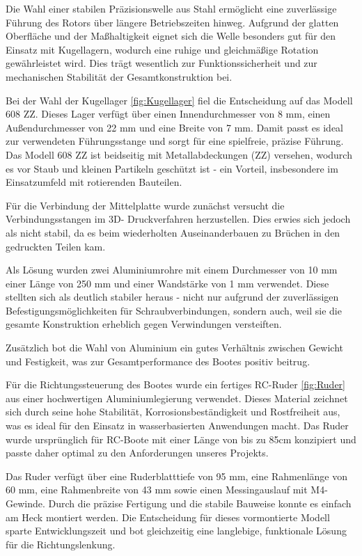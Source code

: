 \documentclass[a4paper,12pt]{article}
\begin{document}
Die Wahl einer stabilen Präzisionswelle aus Stahl ermöglicht eine zuverlässige Führung des Rotors über längere Betriebszeiten hinweg. Aufgrund der glatten Oberfläche und der Maßhaltigkeit eignet sich die Welle besonders gut für den Einsatz mit Kugellagern, wodurch eine ruhige und gleichmäßige Rotation gewährleistet wird. Dies trägt wesentlich zur Funktionssicherheit und zur mechanischen Stabilität der Gesamtkonstruktion bei.\newline


Bei der Wahl der Kugellager \ref{fig:Kugellager} fiel die Entscheidung auf das Modell 608 ZZ. Dieses Lager verfügt über einen Innendurchmesser von 8 mm, einen Außendurchmesser von 22 mm und eine Breite von 7 mm. Damit passt es ideal zur verwendeten Führungsstange und sorgt für eine spielfreie, präzise Führung.
Das Modell 608 ZZ ist beidseitig mit Metallabdeckungen (ZZ) versehen, wodurch es vor Staub und kleinen Partikeln geschützt ist - ein Vorteil, insbesondere im Einsatzumfeld mit rotierenden Bauteilen.\newline

Für die Verbindung der Mittelplatte wurde zunächst versucht die Verbindungsstangen im 3D- Druckverfahren herzustellen. Dies erwies sich jedoch als nicht stabil, da es beim wiederholten Auseinanderbauen zu Brüchen in den gedruckten Teilen kam. 

Als Lösung wurden zwei Aluminiumrohre mit einem Durchmesser von 10 mm einer Länge von 250 mm und einer Wandstärke von 1 mm verwendet. Diese stellten sich als deutlich stabiler heraus - nicht nur aufgrund der zuverlässigen Befestigungsmöglichkeiten für Schraubverbindungen, sondern auch, weil sie die gesamte Konstruktion erheblich gegen Verwindungen versteiften.

Zusätzlich bot die Wahl von Aluminium ein gutes Verhältnis zwischen Gewicht und Festigkeit, was zur Gesamtperformance des Bootes positiv beitrug.\newline


Für die Richtungssteuerung des Bootes wurde ein fertiges RC-Ruder \ref{fig:Ruder} aus einer hochwertigen Aluminiumlegierung verwendet. Dieses Material zeichnet sich durch seine hohe Stabilität, Korrosionsbeständigkeit und Rostfreiheit aus, was es ideal für den Einsatz in wasserbasierten Anwendungen macht. Das Ruder wurde ursprünglich für RC-Boote mit einer Länge von bis zu 85cm konzipiert und passte daher optimal zu den Anforderungen unseres Projekts.

Das Ruder verfügt über eine Ruderblatttiefe von 95 mm, eine Rahmenlänge von 60 mm, eine Rahmenbreite von 43 mm sowie einen Messingauslauf mit M4-Gewinde. Durch die präzise Fertigung und die stabile Bauweise konnte es einfach am Heck montiert werden. Die Entscheidung für dieses vormontierte Modell sparte Entwicklungszeit und bot gleichzeitig eine langlebige, funktionale Lösung für die Richtungslenkung. 
\end{document}
